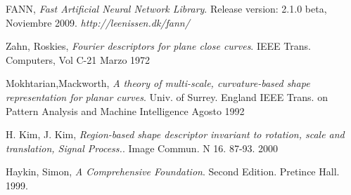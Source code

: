 \documentclass[pdftex,a4paper,10.5pt]{article}
\begin{document}
\begin{thebibliography}{9}
  FANN, 
  \emph{Fast Artificial Neural Network Library}. 
  Release version: 2.1.0 beta, 
  Noviembre 2009.
  \textsl{http://leenissen.dk/fann/}
 
  Zahn, Roskies, 
  \emph{Fourier descriptors for plane close curves}. 
  IEEE Trans. Computers, Vol C-21
  Marzo 1972

 Mokhtarian,Mackworth,
  \emph{A theory of multi-scale, curvature-based shape representation for planar curves}. 
  Univ. of Surrey. England
  IEEE Trans. on Pattern Analysis and Machine Intelligence
  Agosto 1992

  H. Kim, J. Kim,
  \emph{Region-based shape descriptor invariant to rotation, scale and translation, Signal Process.}. 
  Image Commun. N 16. 87-93.
  2000

 Haykin, Simon, 
 \emph{A Comprehensive Foundation}.
 Second Edition. Pretince Hall.
 1999.

  
\end{thebibliography}

\end{document}
